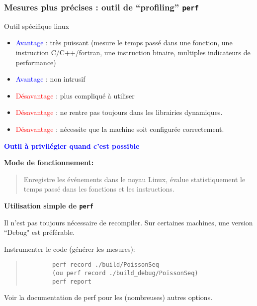 \documentclass{beamer}
\begin{document}
\begin{frame}
	\frametitle{Mesures plus pr\'ecises : outil de ``profiling'' {\tt perf}}
		
	\vfill
	Outil spécifique linux
	
	\begin{itemize}
		\item \textcolor{blue}{Avantage} : tr\`es puissant (mesure le temps pass\'e dans une fonction, une instruction C/C++/fortran, une instruction binaire, multiples indicateurs de performance)
		\item \textcolor{blue}{Avantage} : non intrusif
		\item \textcolor{red}{D\'esavantage} : plus compliqu\'e \`a utiliser
		\item \textcolor{red}{D\'esavantage} : ne rentre pas toujours dans les librairies dynamiques.
		\item \textcolor{red}{D\'esavantage} : n\'ecessite que la machine soit configur\'ee  correctement.
	\end{itemize}
	\vfill
	\textcolor{blue}{\bf Outil \`a privil\'egier quand c'est possible}
\end{frame}
\begin{frame}[fragile]
	
	{\bf 	Mode de fonctionnement:}
	\begin{quote}
		Enregistre les \'ev\'enements dans le noyau Linux, \'evalue statistiquement le temps pass\'e dans les fonctions et les instructions.
	\end{quote} 
	
	\vfill
	{\bf Utilisation simple de {\tt perf}}
	\vfill
	
	Il n'est pas toujours n\'ecessaire de recompiler. Sur certaines machines, une version ``Debug" est pr\'ef\'erable. 
	
	\vfill
	Instrumenter le code (g\'en\'erer les mesures):
	\begin{quote}
		\begin{verbatim}
		perf record ./build/PoissonSeq
		(ou perf record ./build_debug/PoissonSeq)
		perf report
		\end{verbatim}
	\end{quote} 
	
	\vfill
	Voir la documentation de perf pour les (nombreuses) autres options.
	
	\vfill
\end{frame}
\end{document}
